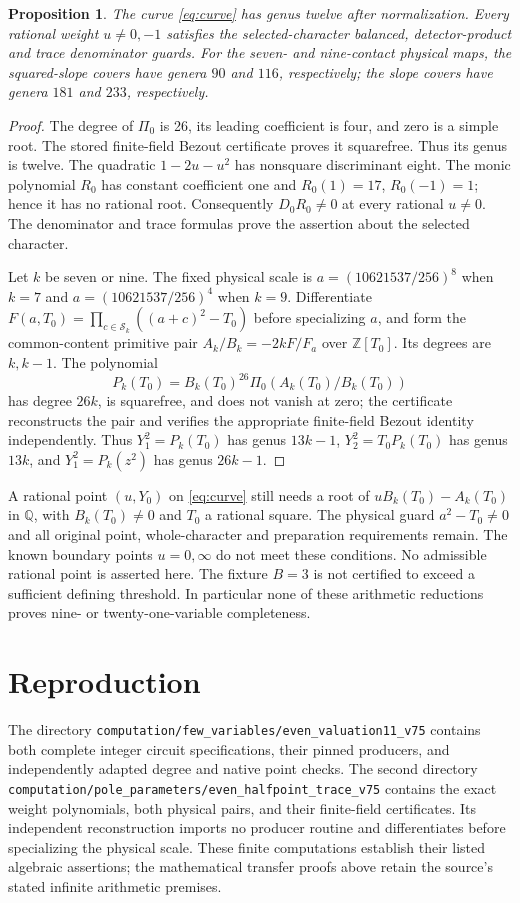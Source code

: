 \documentclass[11pt,a4paper]{article}
\newtheorem{proposition}[theorem]{Proposition}
\newcommand{\Q}{\mathbb Q}\newcommand{\Z}{\mathbb Z}
\begin{document}
\begin{proposition}\label{prop:genus}
The curve \eqref{eq:curve} has genus twelve after normalization.
Every rational weight $u\ne0,-1$ satisfies the selected-character
balanced, detector-product and trace denominator guards. For the seven-
and nine-contact physical maps, the squared-slope covers have genera
$90$ and $116$, respectively; the slope covers have genera $181$ and
$233$, respectively.
\end{proposition}
\begin{proof}
The degree of $\Pi_0$ is 26, its leading coefficient is four, and
zero is a simple root. The stored finite-field Bezout certificate
proves it squarefree. Thus its genus is twelve.
The quadratic $1-2u-u^2$ has nonsquare discriminant eight. The monic
polynomial $R_0$ has constant coefficient one and
$R_0(1)=17$, $R_0(-1)=1$; hence it has no rational root. Consequently
$D_0R_0\ne0$ at every rational $u\ne0$. The denominator and trace
formulas prove the assertion about the selected character.

Let $k$ be seven or nine. The fixed physical scale is
$a=(10621537/256)^8$ when $k=7$ and
$a=(10621537/256)^4$ when $k=9$. Differentiate
$F(a,T_0)=\prod_{c\in\mathcal S_k}((a+c)^2-T_0)$ before specializing
$a$, and form the common-content primitive pair
$A_k/B_k=-2kF/F_a$ over $\Z[T_0]$. Its degrees are $k,k-1$.
The polynomial
\[
              P_k(T_0)=B_k(T_0)^{26}\Pi_0(A_k(T_0)/B_k(T_0))
\]
has degree $26k$, is squarefree, and does not vanish at zero; the
certificate reconstructs the pair and verifies the appropriate
finite-field Bezout identity independently. Thus
$Y_1^2=P_k(T_0)$ has genus $13k-1$,
$Y_2^2=T_0P_k(T_0)$ has genus $13k$, and
$Y_1^2=P_k(z^2)$ has genus $26k-1$.
\end{proof}

A rational point $(u,Y_0)$ on \eqref{eq:curve} still needs a root of
$uB_k(T_0)-A_k(T_0)$ in $\Q$, with $B_k(T_0)\ne0$ and
$T_0$ a rational square. The physical guard $a^2-T_0\ne0$ and
all original point, whole-character and preparation requirements remain.
The known boundary points $u=0,\infty$ do not meet these conditions.
No admissible rational point is asserted here. The fixture $B=3$ is
not certified to exceed a sufficient defining threshold. In particular
none of these arithmetic reductions proves nine- or twenty-one-variable
completeness.

\section{Reproduction}
The directory
\nolinkurl{computation/few_variables/even_valuation11_v75}
contains both complete integer circuit specifications, their pinned
producers, and independently adapted degree and native point checks.
The second directory
\nolinkurl{computation/pole_parameters/even_halfpoint_trace_v75}
contains the exact weight polynomials, both physical pairs, and their
finite-field certificates. Its independent reconstruction imports no
producer routine and differentiates before specializing the physical
scale. These finite computations establish their listed algebraic
assertions; the mathematical transfer proofs above retain the source's
stated infinite arithmetic premises.
\end{document}
